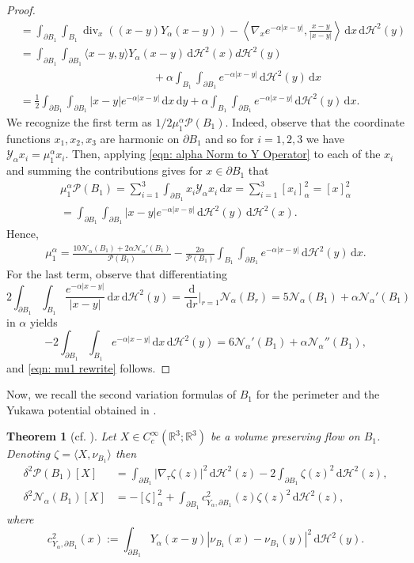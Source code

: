 \documentclass[a4paper,11pt,reqno]{amsart}
\numberwithin{equation}{section}
\newtheorem{theorem}{Theorem}[section]
\theoremstyle{remark}
\theoremstyle{definition}
\renewcommand{\div}{\operatorname{div}}
\newcommand{\dd}{\,\mathrm{d}}
\newcommand{\nl}{\mathcal{N}_{\alpha}}
\newcommand{\Pe}{\mathcal{P}}
\begin{document}
\begin{proof}
\begin{align*}
&=\int_{\partial B_1}\int_{B_1} \div_x\left((x-y)Y_{\alpha}(x-y)\right)-\left\langle \nabla_x e^{-\alpha|x-y|}, \frac{x-y}{|x-y|}\right\rangle \dd x \dd\mathcal{H}^2(y)\\
&=\int_{\partial B_1}\int_{\partial B_1}\langle x-y, y\rangle Y_{\alpha}(x-y) \dd\mathcal{H}^2(x)d\mathcal{H}^2(y) \\
&\qquad\qquad\qquad\qquad\qquad\qquad +\alpha \int_{B_1}\int_{\partial B_1} e^{-\alpha|x-y|} \dd\mathcal{H}^2(y)\dd x\\
&=\frac{1}{2}\int_{\partial B_1}\int_{\partial B_1} |x-y|e^{-\alpha|x-y|} \dd x\dd y + \alpha \int_{B_1}\int_{\partial B_1}e^{-\alpha|x-y|} \dd\mathcal{H}^2(y)\dd x.
\end{align*}
We recognize the first term as $1/2\mu_1^{\alpha}\Pe(B_1)$. Indeed, observe that the coordinate functions $x_1,x_2,x_3$ are harmonic on $\partial B_1$ and so for $i=1,2,3$ we have $\mathscr{Y}_{\alpha}x_i = \mu_1^{\alpha}x_i$. Then, applying \eqref{eqn: alpha Norm to Y Operator} to each of the $x_i$ and summing the contributions gives for $x\in \partial B_1$ that
\begin{multline}\label{eqn: mu1 Computation}
	\mu_1^{\alpha}\Pe(B_1)= \sum_{i=1}^3 \int_{\partial B_1}x_i \mathscr{Y}_{\alpha}x_i \dd x= \sum_{i=1}^3 [x_i]_{\alpha}^2 =[x]_{\alpha}^2\\
	=\int_{\partial B_1}\int_{\partial B_1} |x-y|e^{-\alpha|x-y|} \dd\mathcal{H}^2(y)\dd\mathcal{H}^2(x).
\end{multline}
Hence, 
	\begin{align*}
		\mu_1^{\alpha}= \frac{10\nl(B_1)+2\alpha\nl'(B_1)}{\Pe(B_1)}-\frac{2\alpha}{\Pe(B_1)} \int_{B_1}\int_{\partial B_1}e^{-\alpha|x-y|} \dd\mathcal{H}^2(y)\dd x.
	\end{align*}
For the last term, observe that differentiating
	\[
		2\int_{\partial B_1}\int_{B_1} \frac{e^{-\alpha|x-y|}}{|x-y|} \dd x \dd \mathcal{H}^2(y) = \frac{\dd}{\dd r}\bigg|_{r=1} \nl(B_r) = 5\nl(B_1)+\alpha \nl' (B_1)
	\] 
in $\alpha$ yields
	\[
		-2\int_{\partial B_1}\int_{B_1} e^{-\alpha|x-y|} \dd x\dd \mathcal{H}^2(y) = 6\nl'(B_1)+\alpha \nl''(B_1),
	\]
and \eqref{eqn: mu1 rewrite} follows.
\end{proof}

Now, we recall the second variation formulas of $B_1$ for the perimeter and the Yukawa potential obtained in \cite{FFMMM}.
	\begin{theorem}[{cf. \cite[Theorem 6.1]{FFMMM}}]\label{thm:second_var}
		Let $X\in C_c^{\infty}(\mathbb{R}^3;\mathbb{R}^3)$ be a volume preserving flow on $B_1$. Denoting $\zeta = \langle X,\nu_{B_1}\rangle$ then
		\begin{align*}
			\delta^2 \Pe(B_1)[X] &= \int_{\partial B_1} |\nabla_{\tau}\zeta(z)|^2 \dd\mathcal{H}^2(z) - 2\int_{\partial B_1} \zeta(z)^2 \dd\mathcal{H}^2(z),\\
			\delta^2 \nl(B_1)[X] &= -[\zeta]_{\alpha}^2+ \int_{\partial B_1} c_{Y_{\alpha},\partial B_1}^2(z) \zeta(z)^2 \dd\mathcal{H}^2(z),
		\end{align*}
where
		\[
			c_{Y_{\alpha},\partial B_1}^2(x):=\int_{\partial B_1}Y_{\alpha}(x-y)|\nu_{B_1}(x)-\nu_{B_1}(y)|^2 \dd\mathcal{H}^2(y).
		\]
	\end{theorem}
	
\end{document}

